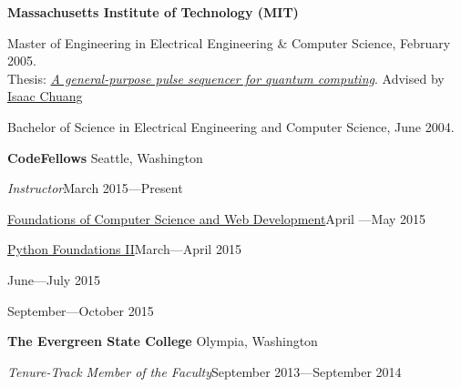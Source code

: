 \documentclass[letter]{article}
\begin{document}
{\bf Massachusetts Institute of Technology (MIT)}
\par
Master of Engineering in Electrical Engineering \& Computer Science, February 2005.\\
Thesis: \href{http://sourceforge.net/project/showfiles.php?group_id=129764&package_id=144780&release_id=307201}{\emph{A general-purpose pulse sequencer for quantum computing}}.
Advised by \href{http://feynman.mit.edu/ike/homepage/index.html}{Isaac Chuang}\\
\par
Bachelor of Science in Electrical Engineering and Computer Science, June 2004.\\
\vspace{\baselineskip}
\par


{\bf CodeFellows} \hfill Seattle, Washington
\vspace{0.5\baselineskip}
\par
{\em Instructor}\hfill March 2015---Present

\vspace{0.5\baselineskip}
\par
\href{https://www.codefellows.org/courses/foundations-1/computer-science-and-web-development}{Foundations of Computer Science and Web Development}\hfill April ---May 2015
\vspace{0.5\baselineskip}
\par
\href{https://www.codefellows.org/courses/foundations-2/python}{Python Foundations II}\hfill March---April 2015
\par
\hfill June---July 2015
\par
\hfill September---October 2015
\vspace{0.5\baselineskip}
\par

{\bf The Evergreen State College} \hfill Olympia, Washington
\vspace{0.5\baselineskip}
\par
{\em Tenure-Track Member of the Faculty}\hfill September 2013---September 2014
\end{document}
